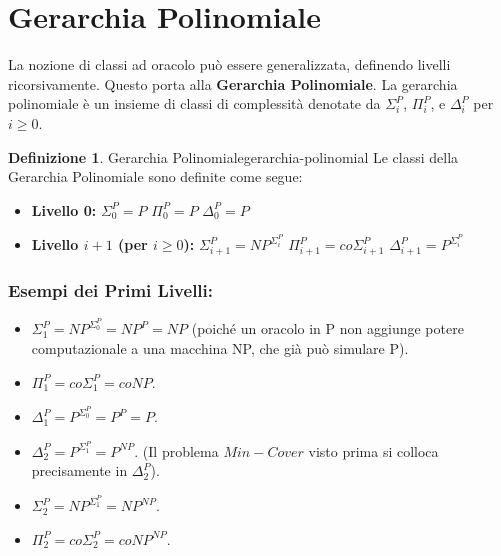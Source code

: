 \documentclass[a4paper]{article}
\theoremstyle{definition} %
\newtheorem{definition}{Definizione}
\begin{document}
\section{Gerarchia Polinomiale}
La nozione di classi ad oracolo può essere generalizzata, definendo livelli ricorsivamente. Questo porta alla \textbf{Gerarchia Polinomiale}.
La gerarchia polinomiale è un insieme di classi di complessità denotate da $\Sigma_i^P$, $\Pi_i^P$, e $\Delta_i^P$ per $i \ge 0$.

\begin{definition}{Gerarchia Polinomiale}{gerarchia-polinomial}
Le classi della Gerarchia Polinomiale sono definite come segue:
\begin{itemize}
    \item \textbf{Livello 0:}
    $\Sigma_0^P = P$
    $\Pi_0^P = P$
    $\Delta_0^P = P$
    \item \textbf{Livello $i+1$ (per $i \ge 0$):}
    $\Sigma_{i+1}^P = NP^{\Sigma_i^P}$
    $\Pi_{i+1}^P = co\Sigma_{i+1}^P$
    $\Delta_{i+1}^P = P^{\Sigma_i^P}$
\end{itemize}
\end{definition}

\subsubsection{Esempi dei Primi Livelli:}
\begin{itemize}
    \item $\Sigma_1^P = NP^{\Sigma_0^P} = NP^P = NP$ (poiché un oracolo in P non aggiunge potere computazionale a una macchina NP, che già può simulare P).
    \item $\Pi_1^P = co\Sigma_1^P = coNP$.
    \item $\Delta_1^P = P^{\Sigma_0^P} = P^P = P$.
    \item $\Delta_2^P = P^{\Sigma_1^P} = P^{NP}$. (Il problema $Min-Cover$ visto prima si colloca precisamente in $\Delta_2^P$).
    \item $\Sigma_2^P = NP^{\Sigma_1^P} = NP^{NP}$.
    \item $\Pi_2^P = co\Sigma_2^P = coNP^{NP}$.
\end{itemize}
\end{document}
